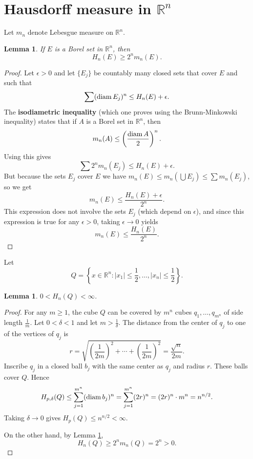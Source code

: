 \documentclass{article}
\newcommand{\diam}{\ensuremath\mathrm{diam}\,}
\newtheorem{lemma}[theorem]{Lemma}
\theoremstyle{definition}
\begin{document}
\section{Hausdorff measure in $\mathbb{R}^n$}
Let $m_n$ denote Lebesgue measure on $\mathbb{R}^n$. 

\begin{lemma}
If $E$ is a Borel set in $\mathbb{R}^n$, then
\[
H_n(E) \geq 2^n m_n(E).
\]
\label{Hnmn}
\end{lemma}
\begin{proof}
Let $\epsilon>0$ and let $\{E_j\}$ be countably many closed sets 
that cover $E$ and such that
\[
\sum (\diam E_j)^n \leq H_n(E)+\epsilon.
\]
The \textbf{isodiametric inequality} (which one proves using the Brunn-Minkowski inequality)
states that if $A$ is a Borel set in $\mathbb{R}^n$, then
\[
m_n(A) \leq \left( \frac{\diam A}{2} \right)^n.
\]
Using this gives
\[
\sum 2^n m_n(E_j) \leq H_n(E)+\epsilon.
\]
But
because the sets $E_j$ cover $E$ we have
$m_n(E) \leq m_n(\bigcup E_j) \leq \sum m_n(E_j)$, so we get
\[
m_n(E) \leq \frac{H_n(E)+\epsilon}{2^n}.
\]
This expression does not involve the sets $E_j$ (which depend on $\epsilon$), and since this expression is true for any
$\epsilon>0$, taking $\epsilon \to 0$ yields
\[
m_n(E) \leq \frac{H_n(E)}{2^n}.
\]
\end{proof}


Let
\[
Q=\left\{x \in \mathbb{R}^n: |x_1| \leq \frac{1}{2}, \ldots, |x_n| \leq \frac{1}{2}\right\}.
\]

\begin{lemma}
$0<H_n(Q)<\infty$.
\label{finitemeasure}
\end{lemma}
\begin{proof}
For any $m \geq 1$, the cube $Q$ can be covered by $m^n$ cubes $q_1,\ldots,q_{m^n}$ of side length $\frac{1}{m}$. 
Let $0<\delta<1$ and let $m>\frac{1}{\delta}$. 
The distance from the center of $q_j$ to one of the vertices of $q_j$ is 
\[
r = \sqrt{\left(\frac{1}{2m}\right)^2+\cdots+\left(\frac{1}{2m}\right)^2}
=\frac{\sqrt{n}}{2m}.
\]
Inscribe $q_j$ in a closed ball $b_j$ with the same center as $q_j$ and radius $r$. 
These balls cover $Q$. Hence
\[
H_{p,\delta}(Q) \leq 
\sum_{j=1}^{m^n} (\diam b_j)^n
=\sum_{j=1}^{m^n} (2r)^n
=(2r)^n \cdot m^n
=n^{n/2}.
\]
Taking $\delta \to 0$ gives $H_p(Q) \leq n^{n/2} < \infty$.

On the other hand, by Lemma \ref{Hnmn},
\[
H_n(Q) \geq 2^n m_n(Q) = 2^n>0.
\]
\end{proof}
\end{document}
